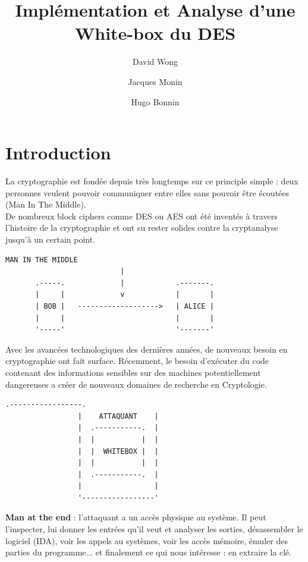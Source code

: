 \documentclass[a4paper,12pt]{article}
\author{David Wong
  \and Jacques Monin
  \and Hugo Bonnin}
\title{Implémentation et Analyse d'une White-box du DES}
\begin{document}
\maketitle

\newpage

\tableofcontents

\newpage

\section{Introduction}

La cryptographie est fondée depuis très longtemps sur ce principle simple : deux personnes veulent pouvoir communiquer entre elles sans pouvoir être écoutées (Man In The Middle).\\
De nombreux block ciphers comme DES ou AES ont été inventés à travers l'histoire de la cryptographie et ont su rester solides contre la cryptanalyse jusqu'à un certain point.\\

\begin{Verbatim}[samepage=true]
                   MAN IN THE MIDDLE
                           |
       .-----.             |            .-------.
       |     |             v            |       |
       | BOB |   ------------------->   | ALICE |
       |     |                          |       |
       '-----'                          '-------'
\end{Verbatim}

Avec les avancées technologiques des dernières années, de nouveaux besoin en cryptographie ont fait surface. Récemment, le besoin d'exécuter du code contenant des informations sensibles sur des machines potentiellement dangereuses a créer de nouveaux domaines de recherche en Cryptologie.\\

\begin{Verbatim}[samepage=true]
                 .-----------------. 
                 |    ATTAQUANT    |
                 |  .-----------.  |  
                 |  |           |  |  
                 |  |  WHITEBOX |  | 
                 |  |           |  | 
                 |  .-----------.  |
                 |                 |
                 '-----------------'
\end{Verbatim}

\textbf{Man at the end} : l'attaquant a un accès physique au système. Il peut l'inspecter, lui donner les entrées qu'il veut et analyser les sorties, désassembler le logiciel (IDA), voir les appels au systèmes, voir les accès mémoire, émuler des parties du programme... et finalement ce qui nous intéresse : en extraire la clé.\\
\end{document}
